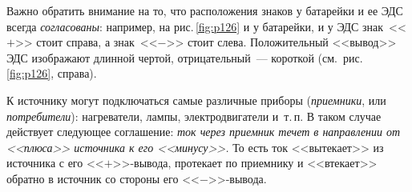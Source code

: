 \documentclass[main.tex]{subfiles}
\begin{document}
\begin{NoHyper}
Важно обратить внимание на то, что расположения знаков у батарейки и ее ЭДС всегда \emph{согласованы}: например, на рис.\,\ref{fig:p126} и у батарейки, и у ЭДС знак~<<$+$>> стоит справа, а знак~<<$-$>> стоит слева. Положительный <<вывод>> ЭДС изображают длинной чертой, отрицательный~--- короткой (см.~рис.\,\ref{fig:p126}, справа). 












К источнику могут подключаться самые различные приборы (\emph{приемники}, или \emph{потребители}): нагреватели, лампы, электродвигатели и~т.\,п. В таком случае действует следующее соглашение: \emph{ток через приемник течет в направлении от <<плюса>> источника к его <<минусу>>.} То есть ток <<вытекает>> из источника с его <<$+$>>-вывода, протекает по приемнику и <<втекает>> обратно в источник со стороны его <<$-$>>-вывода.









\end{NoHyper}
\end{document}
